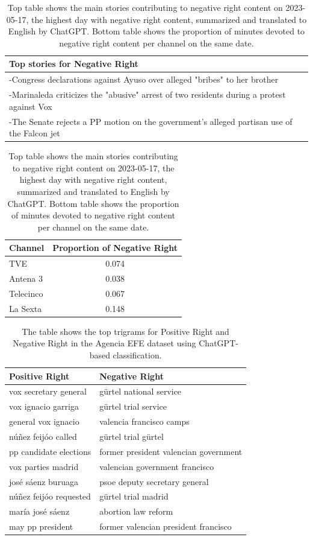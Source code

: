 \documentclass[12pt]{article}
\begin{document}
	
		\begin{table}[!htb]
		\centering
		\begin{tabular}{p{}}
			\toprule
			\textbf{Top stories for  Negative Right}  \\
			\midrule
			-Congress declarations against Ayuso over alleged "bribes" to her brother  \\
			-Marinaleda criticizes the "abusive" arrest of two residents during a protest against Vox  \\
			-The Senate rejects a PP motion on the government's alleged partisan use of the Falcon jet  \\
			\bottomrule
		\end{tabular}
	
		

		\begin{tabular}{l c}
			\toprule
			\textbf{Channel} & \textbf{Proportion of Negative Right} \\
			\midrule
			TVE & 0.074 \\
			Antena 3  & 0.038 \\
			Telecinco  & 0.067 \\
			La Sexta  & 0.148 \\
			\bottomrule
		\end{tabular}
		\caption{Top table shows the main stories contributing to negative right content on 2023-05-17, the highest day with negative right content,  summarized and translated to English by ChatGPT. Bottom table shows the proportion of minutes devoted to negative right content per channel on the same date. }
		\label{tab:neg_right_channels}
	\end{table}
	
	\begin{table}[!htb]
		\caption{Top trigrams for Positive Right and Negative Right in the Agencia EFE}
		\centering
		\begin{tabular}{|l|l|}
			\hline
			Positive Right & Negative Right \\
			\hline
			vox secretary general & gürtel national service \\
			vox ignacio garriga & gürtel trial service \\
			general vox ignacio & valencia francisco camps \\
			núñez feijóo called & gürtel trial gürtel \\
			pp candidate elections & former president valencian government \\
			vox parties madrid & valencian government francisco \\
			josé sáenz buruaga & psoe deputy secretary general \\
			núñez feijóo requested & gürtel trial madrid \\
			maría josé sáenz & abortion law reform \\
			may pp president & former valencian president francisco \\
			\hline
		\end{tabular}
		\caption*{The table shows the top trigrams for Positive Right and Negative Right in the Agencia EFE dataset using ChatGPT-based classification.}
		\label{tab:top_words_pos_right_neg_right}
	\end{table}
	
\end{document}
